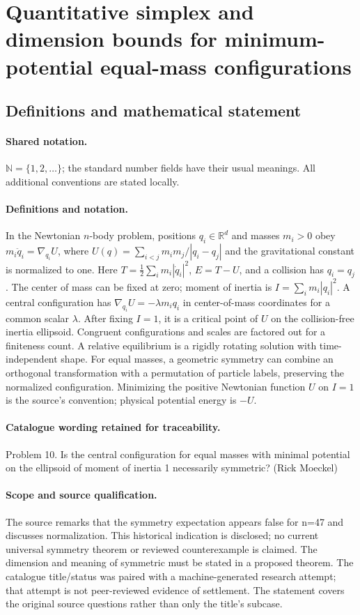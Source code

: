 \documentclass[11pt]{article}
\begin{document}
\section{Quantitative simplex and dimension bounds for minimum-potential equal-mass configurations}\label{statement}

\subsection{Definitions and mathematical statement}

\paragraph{Shared notation.}$\mathbb N=\{1,2,\ldots\}$; the standard number fields have their usual meanings. All additional conventions are stated locally.


\paragraph{Definitions and notation.}In the Newtonian $n$-body problem, positions $q_i\in\mathbb R^d$ and masses $m_i>0$ obey $m_i\ddot q_i=\nabla_{q_i}U$, where $U(q)=\sum_{i<j}m_im_j/|q_i-q_j|$ and the gravitational constant is normalized to one. Here $T=\tfrac12\sum_i m_i|\dot q_i|^2$, $E=T-U$, and a collision has $q_i=q_j$. The center of mass can be fixed at zero; moment of inertia is $I=\sum_i m_i|q_i|^2$. A central configuration has $\nabla_{q_i}U=-\lambda m_iq_i$ in center-of-mass coordinates for a common scalar $\lambda$. After fixing $I=1$, it is a critical point of $U$ on the collision-free inertia ellipsoid. Congruent configurations and scales are factored out for a finiteness count. A relative equilibrium is a rigidly rotating solution with time-independent shape. For equal masses, a geometric symmetry can combine an orthogonal transformation with a permutation of particle labels, preserving the normalized configuration. Minimizing the positive Newtonian function $U$ on $I=1$ is the source’s convention; physical potential energy is $-U$.

\paragraph{Catalogue wording retained for traceability.}
Problem 10. Is the central configuration for equal masses with minimal potential on the ellipsoid of moment of inertia 1 necessarily symmetric? (Rick Moeckel)
\paragraph{Scope and source qualification.}The source remarks that the symmetry expectation appears false for n=47 and discusses normalization. This historical indication is disclosed; no current universal symmetry theorem or reviewed counterexample is claimed. The dimension and meaning of symmetric must be stated in a proposed theorem. The catalogue title/status was paired with a machine-generated research attempt; that attempt is not peer-reviewed evidence of settlement. The statement covers the original source questions rather than only the title’s subcase.
\end{document}
